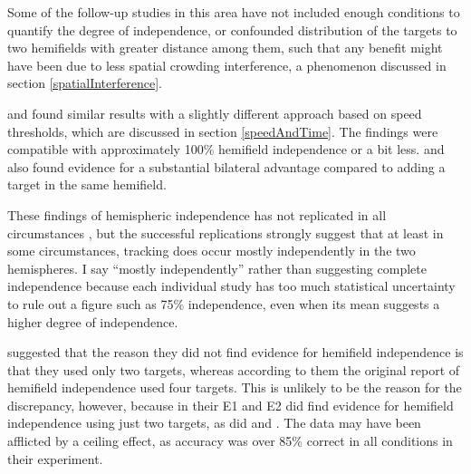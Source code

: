 \documentclass[
]{book}
\begin{document}
Some of the follow-up studies in this area have not included enough conditions to quantify the degree of independence, or confounded distribution of the targets to two hemifields with greater distance among them, such that any benefit might have been due to less spatial crowding interference, a phenomenon discussed in section \ref{spatialInterference}.

\citet{holcombeExhaustingAttentionalTracking2012} and \citet{chenResourceDemandsObject2013} found similar results with a slightly different approach based on speed thresholds, which are discussed in section \ref{speedAndTime}. The findings were compatible with approximately 100\% hemifield independence or a bit less. \citet{shimNumberAttentionalFoci2010} and \citet{stormerWithinhemifieldCompetitionEarly2014} also found evidence for a substantial bilateral advantage compared to adding a target in the same hemifield.

These findings of hemispheric independence has not replicated in all circumstances \citep[e.g.,][]{shimSpatialSeparationTargets2008} , but the successful replications strongly suggest that at least in some circumstances, tracking does occur mostly independently in the two hemispheres. I say ``mostly independently'' rather than suggesting complete independence because each individual study has too much statistical uncertainty to rule out a figure such as 75\% independence, even when its mean suggests a higher degree of independence.

\citet{shimSpatialSeparationTargets2008} suggested that the reason they did not find evidence for hemifield independence is that they used only two targets, whereas according to them the original \citet{alvarezIndependentResourcesAttentional2005} report of hemifield independence used four targets. This is unlikely to be the reason for the discrepancy, however, because in their E1 and E2 \citet{alvarezIndependentResourcesAttentional2005} did find evidence for hemifield independence using just two targets, as did \citet{holcombeExhaustingAttentionalTracking2012} and \citet{stormerWithinhemifieldCompetitionEarly2014}. The \citet{shimSpatialSeparationTargets2008} data may have been afflicted by a ceiling effect, as accuracy was over 85\% correct in all conditions in their experiment.
\end{document}
